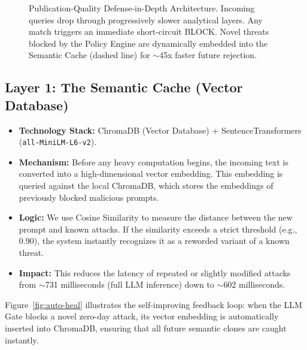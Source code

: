 \documentclass[12pt,a4paper]{article}
\begin{document}
\begin{figure}[H]
\caption{Publication-Quality Defense-in-Depth Architecture. Incoming queries drop through progressively slower analytical layers. Any match triggers an immediate short-circuit BLOCK. Novel threats blocked by the Policy Engine are dynamically embedded into the Semantic Cache (dashed line) for $\sim$45x faster future rejection.}
\label{fig:arch-flow}
\end{figure}

\subsection{Layer 1: The Semantic Cache (Vector Database)}

\begin{itemize}
    \item \textbf{Technology Stack:} ChromaDB (Vector Database) + SentenceTransformers (\texttt{all-MiniLM-L6-v2}).
    \item \textbf{Mechanism:} Before any heavy computation begins, the incoming text is converted into a high-dimensional vector embedding. This embedding is queried against the local ChromaDB, which stores the embeddings of previously blocked malicious prompts.
    \item \textbf{Logic:} We use Cosine Similarity to measure the distance between the new prompt and known attacks. If the similarity exceeds a strict threshold (e.g., 0.90), the system instantly recognizes it as a reworded variant of a known threat.
    \item \textbf{Impact:} This reduces the latency of repeated or slightly modified attacks from $\sim$731 milliseconds (full LLM inference) down to $\sim$602 milliseconds.
\end{itemize}

Figure~\ref{fig:auto-heal} illustrates the self-improving feedback loop: when the LLM Gate blocks a novel zero-day attack, its vector embedding is automatically inserted into ChromaDB, ensuring that all future semantic clones are caught instantly.
\end{document}

